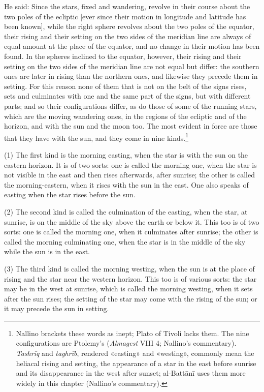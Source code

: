 \documentclass[11pt]{article}
\newcommand{\ArPage}[1]{\marginpar{\footnotesize\color{gray}Ar.\,p.\,#1}}
\begin{document}
\par He said: Since the stars, fixed and wandering, revolve in their course about the two poles of the ecliptic [ever since their motion in longitude and latitude has been known], while the right sphere revolves about the two poles of the equator, their rising and their setting on the two sides of the meridian line are always of equal amount at the place of the equator, and no change in their motion has been found. In the spheres inclined to the equator, however, their rising and their setting on the two sides of the meridian line are not equal but differ: the southern ones are later in rising than the northern ones, and likewise they precede them in setting. For this reason none of them that is not on the belt of the signs rises, sets and culminates with one and the same part of the signs, but with different parts; and so their configurations differ, as do those of some of the running stars, which are the moving wandering ones, in the regions of the ecliptic and of the horizon, and with the sun and the moon too. The most evident in force are those that they have with the sun, and they come in nine kinds.\footnote{Nallino brackets these words as inept; Plato of Tivoli lacks them. The nine configurations are Ptolemy's (\emph{Almagest} VIII 4; Nallino's commentary). \emph{Tashrīq} and \emph{taghrīb}, rendered «easting» and «westing», commonly mean the heliacal rising and setting, the appearance of a star in the east before sunrise and its disappearance in the west after sunset; al-Battānī uses them more widely in this chapter (Nallino's commentary).}\par
\par (1) The first kind is the morning easting, when the star is with the sun on the eastern horizon. It is of two sorts: one is called the morning one, when the star is not visible in the east and then rises afterwards, after sunrise; the other is called the morning-eastern, when it rises with the sun in the east. One also speaks of easting when the star rises before the sun.\par
\par (2) The second kind is called the culmination of the easting, when the star, at sunrise, is on the middle of the sky above the earth or below it. This too is of two sorts: one is called the morning one, when it culminates after sunrise; the other is called the morning culminating one, when the star is in the middle of the sky while the sun is in the east.\par
\par \ArPage{180}(3) The third kind is called the morning westing, when the sun is at the place of rising and the star near the western horizon. This too is of various sorts: the star may be in the west at sunrise, which is called the morning westing, when it sets after the sun rises; the setting of the star may come with the rising of the sun; or it may precede the sun in setting.\par
\end{document}
